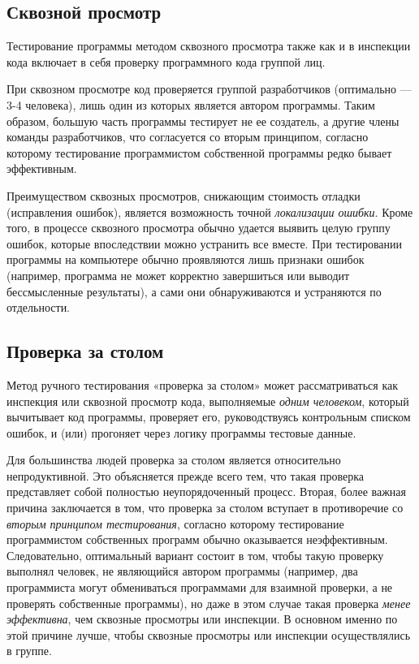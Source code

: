 \documentclass[11pt,a4paper,final]{article} %
\begin{document}
\subsection{Сквозной просмотр}
Тестирование программы методом сквозного просмотра также как и в инспекции кода включает в себя проверку программного кода группой лиц.

При сквозном просмотре код проверяется группой разработчиков (оптимально — 3-4 человека), лишь один из которых является автором программы. Таким образом, большую часть программы тестирует не ее создатель, а другие члены команды разработчиков, что согласуется со вторым принципом, согласно которому тестирование программистом собственной программы редко бывает эффективным.

Преимуществом сквозных просмотров, снижающим стоимость отладки (исправления ошибок), является возможность точной \textit{локализации ошибки}. Кроме того, в процессе сквозного просмотра обычно удается выявить целую группу ошибок, которые впоследствии можно устранить все вместе. При тестировании программы на компьютере обычно проявляются лишь признаки ошибок (например, программа не может корректно завершиться или выводит бессмысленные результаты), а сами они обнаруживаются и устраняются по отдельности.

\subsection{Проверка за столом}
Метод ручного тестирования «проверка за столом» может рассматриваться как инспекция или сквозной просмотр кода, выполняемые \textit{одним человеком}, который вычитывает код программы, проверяет его, руководствуясь контрольным списком ошибок, и (или) прогоняет через логику программы тестовые данные.

Для большинства людей проверка за столом является относительно непродуктивной. Это объясняется прежде всего тем, что такая проверка представляет собой полностью неупорядоченный процесс. Вторая, более важная причина заключается в том, что проверка за столом вступает в противоречие со \textit{вторым принципом тестирования}, согласно которому тестирование программистом собственных программ обычно оказывается неэффективным. Следовательно, оптимальный вариант состоит в том, чтобы такую проверку выполнял человек, не являющийся автором программы (например, два программиста могут обмениваться программами для взаимной проверки, а не проверять собственные программы), но даже в этом случае такая проверка \textit{менее эффективна}, чем сквозные просмотры или инспекции. В основном именно по этой причине лучше, чтобы сквозные просмотры или инспекции осуществлялись в группе.
\end{document}

